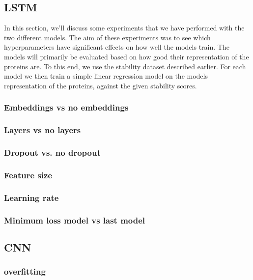 \subsection{LSTM}  %
In this section, we'll discuss some experiments that we have performed with the two different models. The aim of these experiments was to see which hyperparameters have significant effects on how well the models train. The models will primarily be evaluated based on how good their representation of the proteins are. To this end, we use the stability dataset described earlier. For each model we then train a simple linear regression model on the models representation of the proteins, against the given stability scores.

\subsubsection{Embeddings vs no embeddings} %

\subsubsection{Layers vs no layers}

\subsubsection{Dropout vs. no dropout} %


\subsubsection{Feature size} %


\subsubsection{Learning rate} %


\subsubsection{Minimum loss model vs last model} %



\subsection{CNN} %
\subsubsection{overfitting} %